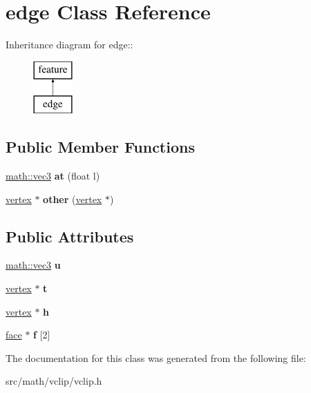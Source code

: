 \hypertarget{classedge}{
\section{edge Class Reference}
\label{classedge}
}
Inheritance diagram for edge::\begin{figure}[H]
\begin{center}
\leavevmode
\includegraphics[height=2cm]{classedge}
\end{center}
\end{figure}
\subsection*{Public Member Functions}
\begin{DoxyCompactItemize}
\item 
\hypertarget{classedge_accdb9854acefe81b1dee217abb4c5c55}{
\hyperlink{classmath_1_1vec3}{math::vec3} {\bfseries at} (float l)}
\label{classedge_accdb9854acefe81b1dee217abb4c5c55}

\item 
\hypertarget{classedge_a0fea19012bb1bb4a15e3412977e5d161}{
\hyperlink{classvertex}{vertex} $\ast$ {\bfseries other} (\hyperlink{classvertex}{vertex} $\ast$)}
\label{classedge_a0fea19012bb1bb4a15e3412977e5d161}

\end{DoxyCompactItemize}
\subsection*{Public Attributes}
\begin{DoxyCompactItemize}
\item 
\hypertarget{classedge_ad56afec0fd1621fcc56f24f1edefca19}{
\hyperlink{classmath_1_1vec3}{math::vec3} {\bfseries u}}
\label{classedge_ad56afec0fd1621fcc56f24f1edefca19}

\item 
\hypertarget{classedge_a6c0eb36b7ec40943fcd633c3eda2a206}{
\hyperlink{classvertex}{vertex} $\ast$ {\bfseries t}}
\label{classedge_a6c0eb36b7ec40943fcd633c3eda2a206}

\item 
\hypertarget{classedge_aab93143962ff82c557e7796151d4809f}{
\hyperlink{classvertex}{vertex} $\ast$ {\bfseries h}}
\label{classedge_aab93143962ff82c557e7796151d4809f}

\item 
\hypertarget{classedge_a32f90bcc15f534bc1bd03a535274bacc}{
\hyperlink{classface}{face} $\ast$ {\bfseries f} \mbox{[}2\mbox{]}}
\label{classedge_a32f90bcc15f534bc1bd03a535274bacc}

\end{DoxyCompactItemize}


The documentation for this class was generated from the following file:\begin{DoxyCompactItemize}
\item 
src/math/vclip/vclip.h\end{DoxyCompactItemize}
